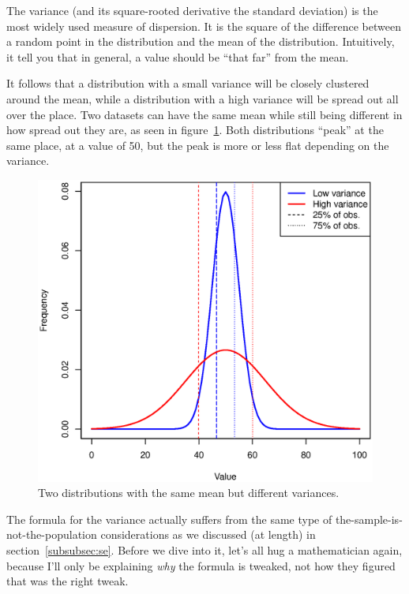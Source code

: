 \documentclass{report}
\begin{document}
		The variance (and its square-rooted derivative the standard deviation) is the most widely used measure of dispersion. It is the square of the difference between a random point in the distribution and the mean of the distribution. Intuitively, it tell you that in general, a value should be ``that far'' from the mean.
		
		It follows that a distribution with a small variance will be closely clustered around the mean, while a distribution with a high variance will be spread out all over the place. Two datasets can have the same mean while still being different in how spread out they are, as seen in figure~\ref{fig:var}. Both distributions ``peak'' at the same place, at a value of 50, but the peak is more or less flat depending on the variance.
		
		\begin{figure}[h]
			\centering
			\includegraphics[width=1.0\textwidth]{var.eps}
			\caption{Two distributions with the same mean but different variances.}
			\label{fig:var}
		\end{figure}
	
		The formula for the variance actually suffers from the same type of the-sample-is-not-the-population considerations as we discussed (at length) in section~\ref{subsubsec:se}. Before we dive into it, let's all hug a mathematician again, because I'll only be explaining \emph{why} the formula is tweaked, not how they figured that was the right tweak.
		
\end{document}
